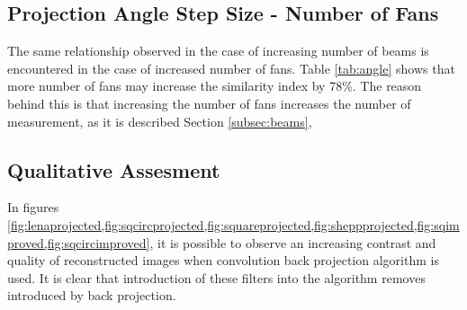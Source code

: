 \documentclass[journal]{IEEEtran}
\begin{document}
\subsection{Projection Angle Step Size - Number of Fans}
The same relationship observed in the case of increasing number of beams is encountered in the case of increased number of fans. Table \ref{tab:angle} shows that more number of fans may increase the similarity index by 78\%. The reason behind this is that increasing the number of fans increases the number of measurement, as it is described Section \ref{subsec:beams}, 

\subsection{Qualitative Assesment}
In figures \cref{fig:lenaprojected,fig:sqcircprojected,fig:squareprojected,fig:sheppprojected,fig:sqimproved,fig:sqcircimproved}, it is possible to observe an increasing contrast and quality of reconstructed images when convolution back projection algorithm is used. It is clear that introduction of these filters into the algorithm removes introduced by back projection. 
\newpage
\printbibliography
\end{document}
